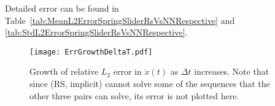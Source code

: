 Detailed error can be found in Table~\ref{tab:MeanL2ErrorSpringSliderRsVsNNRespective} and \ref{tab:StdL2ErrorSpringSliderRsVsNNRespective}.
\begin{figure}
    \centering
    \texttt{[image: ErrGrowthDeltaT.pdf]}
    \caption{Growth of relative $L_2$ error in $\dot{x}(t)$ as $\Delta t$ increases. 
    Note that since (RS, implicit) cannot solve some of the sequences that the other three pairs can solve, 
    its error is not plotted here.}
    \label{fig:ErrGrowthDt}
\end{figure}

